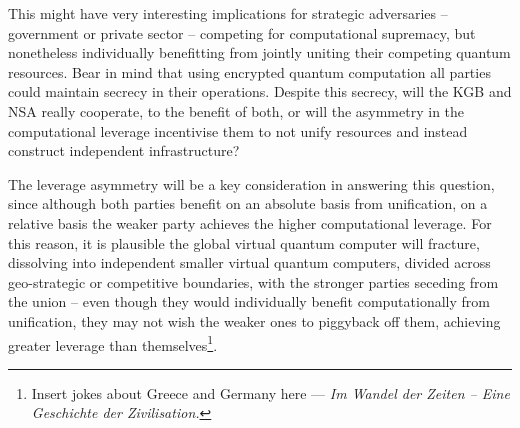 This might have very interesting implications for strategic adversaries -- government or private sector -- competing for computational supremacy, but nonetheless individually benefitting from jointly uniting their competing quantum resources. Bear in mind that using encrypted quantum computation all parties could maintain secrecy in their operations. Despite this secrecy, will the KGB and NSA really cooperate, to the benefit of both, or will the asymmetry in the computational leverage incentivise them to not unify resources and instead construct independent infrastructure?

The leverage asymmetry will be a key consideration in answering this question, since although both parties benefit on an absolute basis from unification, on a relative basis the weaker party achieves the higher computational leverage. For this reason, it is plausible the global virtual quantum computer will fracture, dissolving into independent smaller virtual quantum computers, divided across geo-strategic or competitive boundaries, with the stronger parties seceding from the union -- even though they would individually benefit computationally from unification, they may not wish the weaker ones to piggyback off them, achieving greater leverage than themselves\footnote{Insert jokes about Greece and Germany here --- \textit{Im Wandel der Zeiten -- Eine Geschichte der Zivilisation.}}.